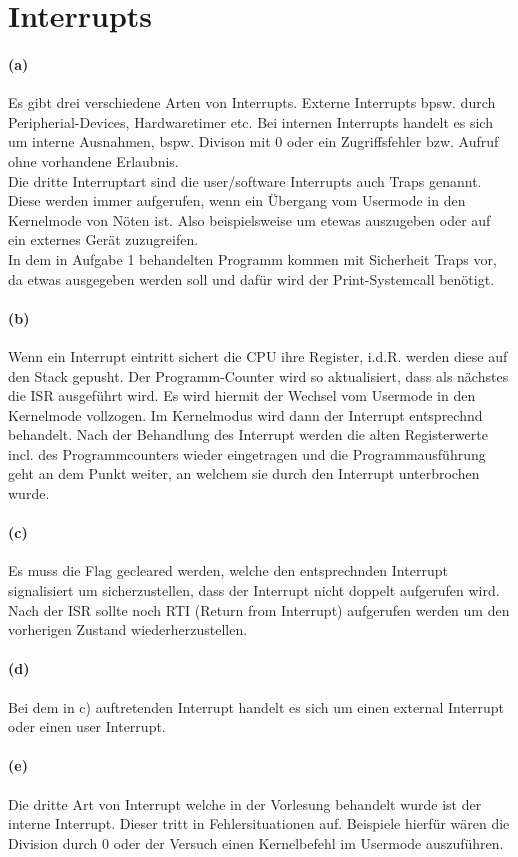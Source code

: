 \documentclass[a4paper]{article}
\begin{document}
\section{Interrupts}


\paragraph{(a)}
Es gibt drei verschiedene Arten von Interrupts. Externe Interrupts bpsw. durch Peripherial-Devices, Hardwaretimer etc. Bei internen Interrupts handelt es sich um interne Ausnahmen, bspw. Divison mit 0 oder ein Zugriffsfehler bzw. Aufruf ohne vorhandene Erlaubnis.\\
Die dritte Interruptart sind die user/software Interrupts auch Traps genannt. Diese werden immer aufgerufen, wenn ein Übergang vom Usermode in den Kernelmode von Nöten ist. Also beispielsweise um etewas auszugeben oder auf ein externes Gerät zuzugreifen.\\
In dem in Aufgabe 1 behandelten Programm kommen mit Sicherheit Traps vor, da etwas ausgegeben werden soll und dafür wird der Print-Systemcall benötigt.

\paragraph{(b)}
Wenn ein Interrupt eintritt sichert die CPU ihre Register, i.d.R. werden diese auf den Stack gepusht. Der Programm-Counter wird so aktualisiert, dass als nächstes die ISR ausgeführt wird. Es wird hiermit der Wechsel vom Usermode in den Kernelmode vollzogen. Im Kernelmodus wird dann der Interrupt entsprechnd behandelt. Nach der Behandlung des Interrupt werden die alten Registerwerte incl. des Programmcounters wieder eingetragen und die Programmausführung geht an dem Punkt weiter, an welchem sie durch den Interrupt unterbrochen wurde.

\paragraph{(c)}
Es muss die Flag gecleared werden, welche den entsprechnden Interrupt signalisiert um sicherzustellen, dass der Interrupt nicht doppelt aufgerufen wird. \\
Nach der ISR sollte noch RTI (Return from Interrupt) aufgerufen werden um den vorherigen Zustand wiederherzustellen.

\paragraph{(d)}
Bei dem in c) auftretenden Interrupt handelt es sich um einen external Interrupt oder einen user Interrupt. 

\paragraph{(e)}
Die dritte Art von Interrupt welche in der Vorlesung behandelt wurde ist der interne Interrupt. Dieser tritt in Fehlersituationen auf. Beispiele hierfür wären die Division durch 0 oder der Versuch einen Kernelbefehl im Usermode auszuführen.
\end{document}
